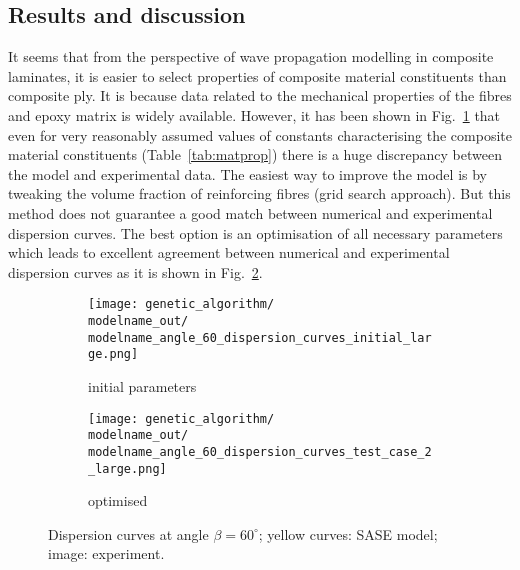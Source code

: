 \documentclass[preprint,12pt]{elsarticle}
\begin{document}
	\subsection{Results and discussion}
It seems that from the perspective of wave propagation modelling in composite laminates, it is easier to select properties of composite material constituents than composite ply. It is because data related to the mechanical properties of the fibres and epoxy matrix is widely available. However, it has been shown in Fig.~\ref{fig:dispersion60deg_initial} that even for very reasonably assumed values of constants characterising the composite material constituents (Table~\ref{tab:matprop}) there is a huge discrepancy between the model and experimental data. The easiest way to improve the model is by tweaking the volume fraction of reinforcing fibres (grid search approach). But this method does not guarantee a good match between numerical and experimental dispersion curves. The best option is an optimisation of all necessary parameters which leads to excellent agreement between numerical and experimental dispersion curves as it is shown in Fig.~\ref{fig:dispersion60deg}.
	\begin{figure} [h!]
		\newcommand{\modelname}{ga_plain_weave_known_mass}
		\centering
		\begin{subfigure}[b]{\textwidth}
			\centering
		   \texttt{[image: genetic\_algorithm/\\modelname\_out/\\modelname\_angle\_60\_dispersion\_curves\_initial\_large.png]}
			\caption{initial parameters}
			\label{fig:dispersion60deg_initial}
		\end{subfigure}
		\begin{subfigure}[b]{\textwidth}
			\centering
			\texttt{[image: genetic\_algorithm/\\modelname\_out/\\modelname\_angle\_60\_dispersion\_curves\_test\_case\_2\_large.png]}
			\caption{optimised}
			\label{fig:dispersion60deg}
		\end{subfigure}
	\caption{Dispersion curves at angle $\beta = 60^{\circ}$; yellow curves: SASE model; image: experiment. }
	\label{fig:initial_optimized}
	\end{figure}
\end{document}
